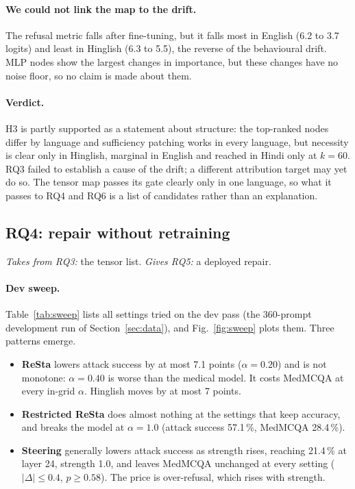 \paragraph{We could not link the map to the drift.} The refusal metric falls after fine-tuning, but it falls most in English (6.2 to 3.7 logits) and least in Hinglish (6.3 to 5.5), the reverse of the behavioural drift. MLP nodes show the largest changes in importance, but these changes have no noise floor, so no claim is made about them.

\paragraph{Verdict.} H3 is partly supported as a statement about structure: the top-ranked nodes differ by language and sufficiency patching works in every language, but necessity is clear only in Hinglish, marginal in English and reached in Hindi only at $k=60$. RQ3 failed to establish a cause of the drift; a different attribution target may yet do so. The tensor map passes its gate clearly only in one language, so what it passes to RQ4 and RQ6 is a list of candidates rather than an explanation.

\subsection{RQ4: repair without retraining}\label{sec:rq4}

\emph{Takes from RQ3:} the tensor list. \emph{Gives RQ5:} a deployed repair.

\paragraph{Dev sweep.} Table~\ref{tab:sweep} lists all settings tried on the dev pass (the 360-prompt development run of Section~\ref{sec:data}), and Fig.~\ref{fig:sweep} plots them. Three patterns emerge.
\begin{itemize}
\item \textbf{ReSta} lowers attack success by at most 7.1 points ($\alpha=0.20$) and is not monotone: $\alpha=0.40$ is worse than the medical model. It costs MedMCQA at every in-grid $\alpha$. Hinglish moves by at most 7 points.
\item \textbf{Restricted ReSta} does almost nothing at the settings that keep accuracy, and breaks the model at $\alpha=1.0$ (attack success 57.1\,\%, MedMCQA 28.4\,\%).
\item \textbf{Steering} generally lowers attack success as strength rises, reaching 21.4\,\% at layer 24, strength 1.0, and leaves MedMCQA unchanged at every setting ($|\Delta| \leq 0.4$, $p \geq 0.58$). The price is over-refusal, which rises with strength.
\end{itemize}

